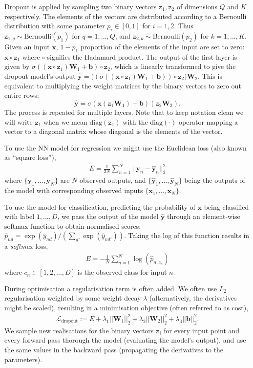 \documentclass{article} %
\newcommand{\cL}{\mathcal{L}}
\newcommand{\x}{\mathbf{x}}
\newcommand{\Bb}{\mathbf{b}}
\newcommand{\sBb}{\mathtt{z}}
\newcommand{\y}{\mathbf{y}}
\newcommand{\W}{\mathbf{W}}
\newcommand{\diag}{\text{diag}}
\newcommand{\weightdecay}{\lambda}
\theoremstyle{definition}
\begin{document}
Dropout is applied by sampling two binary vectors $\sBb_1, \sBb_2$ of dimensions $Q$ and $K$ respectively. The elements of the vectors are distributed according to a Bernoulli distribution with some parameter $p_i \in [0,1]$ for $i = 1,2$. Thus $\sBb_{1,q} \sim \text{Bernoulli}(p_1)$ for $q = 1,...,Q$, and $\sBb_{2,k} \sim \text{Bernoulli}(p_2)$ for $k = 1, ..., K$. Given an input $\x$, $1 - p_1$ proportion of the elements of the input are set to zero: $\x \circ \sBb_1$ where $\circ$ signifies the Hadamard product.
The output of the first layer is given by $\sigma((\x \circ \sBb_1)\W_1 + \Bb) \circ \sBb_2$, which is linearly transformed to give the dropout model's output $\widehat{\y} = \big( (\sigma((\x \circ \sBb_1)\W_1 + \Bb)) \circ\sBb_2 \big) \W_2$. This is equivalent to multiplying the weight matrices by the binary vectors to zero out entire rows: 
$$\widehat{\y} = \sigma(\x (\sBb_1 \W_1) + \Bb)(\sBb_2 \W_2).$$
The process is repeated for multiple layers. Note that to keep notation clean we will write $\sBb_1$ when we mean $\diag(\sBb_1)$ with the $\diag(\cdot)$ operator mapping a vector to a diagonal matrix whose diagonal is the elements of the vector. 

To use the NN model for regression we might use the Euclidean loss (also known as ``square loss''),
\begin{align} \label{eq:NN:reg}
E = \frac{1}{2N}
\sum_{n=1}^N ||\y_n - \widehat{\y}_n||^2_2
\end{align}
where $\{\y_1, \hdots, \y_N\}$ are $N$ observed outputs, and $\{\widehat{\y}_1, \hdots, \widehat{\y}_N\}$ being the outputs of the model with corresponding observed inputs $\{ \x_1, \hdots, \x_N \}$. 

To use the model for classification, predicting the probability of $\x$ being classified with label $1,...,D$, we pass the output of the model $\widehat{\y}$ through an element-wise softmax function to obtain normalised scores: $\widehat{p}_{nd} = \exp(\widehat{y}_{nd}) / \left(\sum_{d'} \exp(\widehat{y}_{nd'})\right)$. Taking the log of this function results in a \textit{softmax} loss,
\begin{align} \label{eq:NN:class}
E = -\frac{1}{N} \sum\limits_{n=1}^N \log(\widehat{p}_{n,c_n})
\end{align}
where $c_n \in [1, 2, ..., D]$ is the observed class for input $n$.

During optimisation a regularisation term is often added.
We often use $L_2$ regularisation weighted by some weight decay $\weightdecay$ (alternatively, the derivatives might be scaled), resulting in a minimisation objective (often referred to as cost),
\begin{align} \label{eq:L:dropout}
\cL_{\text{dropout}} := E + \weightdecay_1 ||\W_1||^2_2 + \weightdecay_2 ||\W_2||^2_2 + \weightdecay_3 ||\Bb||^2_2.
\end{align}
We sample new realisations for the binary vectors $\sBb_i$ for every input point and every forward pass thorough the model (evaluating the model's output), and use the same values in the backward pass (propagating the derivatives to the parameters). 
\end{document}
